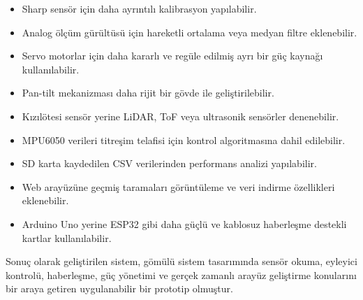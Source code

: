\begin{itemize}
    \item Sharp sensör için daha ayrıntılı kalibrasyon yapılabilir.
    \item Analog ölçüm gürültüsü için hareketli ortalama veya medyan filtre eklenebilir.
    \item Servo motorlar için daha kararlı ve regüle edilmiş ayrı bir güç kaynağı kullanılabilir.
    \item Pan-tilt mekanizması daha rijit bir gövde ile geliştirilebilir.
    \item Kızılötesi sensör yerine LiDAR, ToF veya ultrasonik sensörler denenebilir.
    \item MPU6050 verileri titreşim telafisi için kontrol algoritmasına dahil edilebilir.
    \item SD karta kaydedilen CSV verilerinden performans analizi yapılabilir.
    \item Web arayüzüne geçmiş taramaları görüntüleme ve veri indirme özellikleri eklenebilir.
    \item Arduino Uno yerine ESP32 gibi daha güçlü ve kablosuz haberleşme destekli kartlar kullanılabilir.
\end{itemize}

Sonuç olarak geliştirilen sistem, gömülü sistem tasarımında sensör okuma, eyleyici kontrolü, haberleşme, güç yönetimi ve gerçek zamanlı arayüz geliştirme konularını bir araya getiren uygulanabilir bir prototip olmuştur.
